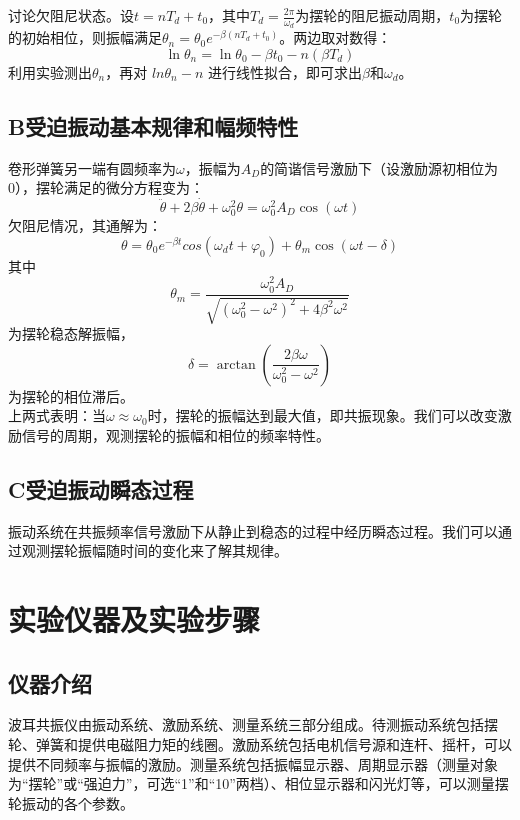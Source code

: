 \documentclass{ctexart}
\begin{document}
讨论欠阻尼状态。设$ t=nT_d+t_0 $，其中$T_d = \frac{2\pi}{\omega_d}$为摆轮的阻尼振动周期，$t_0$为摆轮的初始相位，则振幅满足$\theta_n=\theta_0e^{-\beta(nT_d+t_0)}$。两边取对数得：
\begin{equation}
  \ln\theta_n = \ln\theta_0 -\beta t_0- n(\beta T_d)
\end{equation}
利用实验测出$\theta_n $，再对 $ln\theta_n-n$ 进行线性拟合，即可求出$\beta$和$\omega_d$。


\subsection*{B\quad 受迫振动基本规律和幅频特性}
卷形弹簧另一端有圆频率为$\omega$，振幅为$A_D$的简谐信号激励下（设激励源初相位为0），摆轮满足的微分方程变为：
\begin{equation}
  \ddot{\theta} + 2\beta \dot{\theta} + \omega_0^2\theta = \omega_0^2A_D\cos(\omega t)
\end{equation}
欠阻尼情况，其通解为：
\begin{equation}
  \theta = \theta_0 e^{-\beta t}cos(\omega_d t+\varphi_0) + \theta_m\cos(\omega t-\delta)
\end{equation}
其中
\begin{equation}
\theta_m=\frac{\omega_0^2A_D}{\sqrt{(\omega_0^2-\omega^2)^2+4\beta^2\omega^2}}
\end{equation}
为摆轮稳态解振幅，
\begin{equation}
\delta=\arctan(\frac{2\beta \omega}{\omega_0^2-\omega^2})
\end{equation}
为摆轮的相位滞后。\\
上两式表明：当$\omega \approx \omega_0$时，摆轮的振幅达到最大值，即共振现象。我们可以改变激励信号的周期，观测摆轮的振幅和相位的频率特性。

\subsection*{C\quad 受迫振动瞬态过程}
振动系统在共振频率信号激励下从静止到稳态的过程中经历瞬态过程。我们可以通过观测摆轮振幅随时间的变化来了解其规律。

\section{实验仪器及实验步骤}

\subsection{仪器介绍}
波耳共振仪由振动系统、激励系统、测量系统三部分组成。待测振动系统包括摆轮、弹簧和提供电磁阻力矩的线圈。激励系统包括电机信号源和连杆、摇杆，可以提供不同频率与振幅的激励。测量系统包括振幅显示器、周期显示器（测量对象为“摆轮”或“强迫力”，可选“1”和“10”两档）、相位显示器和闪光灯等，可以测量摆轮振动的各个参数。
\end{document}
